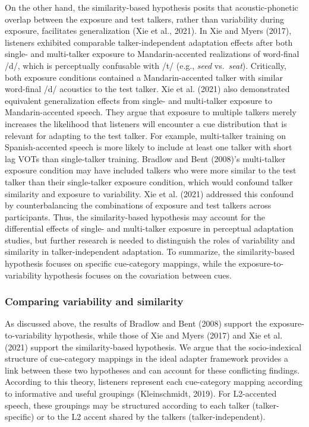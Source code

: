 \documentclass[
  12pt,
  twoside]{article}
\begin{document}
On the other hand, the similarity-based hypothesis posits that acoustic-phonetic overlap between the exposure and test talkers, rather than variability during exposure, facilitates generalization (Xie et al., 2021).
In Xie and Myers (2017), listeners exhibited comparable talker-independent adaptation effects after both single- and multi-talker exposure to Mandarin-accented realizations of word-final /d/, which is perceptually confusable with /t/ (e.g., \emph{seed} vs.~\emph{seat}).
Critically, both exposure conditions contained a Mandarin-accented talker with similar word-final /d/ acoustics to the test talker.
Xie et al. (2021) also demonstrated equivalent generalization effects from single- and multi-talker exposure to Mandarin-accented speech.
They argue that exposure to multiple talkers merely increases the likelihood that listeners will encounter a cue distribution that is relevant for adapting to the test talker.
For example, multi-talker training on Spanish-accented speech is more likely to include at least one talker with short lag VOTs than single-talker training.
Bradlow and Bent (2008)'s multi-talker exposure condition may have included talkers who were more similar to the test talker than their single-talker exposure condition, which would confound talker similarity and exposure to variability.
Xie et al. (2021) addressed this confound by counterbalancing the combinations of exposure and test talkers across participants.
Thus, the similarity-based hypothesis may account for the differential effects of single- and multi-talker exposure in perceptual adaptation studies, but further research is needed to distinguish the roles of variability and similarity in talker-independent adaptation.
To summarize, the similarity-based hypothesis focuses on specific cue-category mappings, while the exposure-to-variability hypothesis focuses on the covariation between cues.

\hypertarget{comparing-variability-and-similarity}{%
\subsubsection{Comparing variability and similarity}\label{comparing-variability-and-similarity}}

As discussed above, the results of Bradlow and Bent (2008) support the exposure-to-variability hypothesis, while those of Xie and Myers (2017) and Xie et al. (2021) support the similarity-based hypothesis.
We argue that the socio-indexical structure of cue-category mappings in the ideal adapter framework provides a link between these two hypotheses and can account for these conflicting findings.
According to this theory, listeners represent each cue-category mapping according to informative and useful groupings (Kleinschmidt, 2019).
For L2-accented speech, these groupings may be structured according to each talker (talker-specific) or to the L2 accent shared by the talkers (talker-independent).
\end{document}
